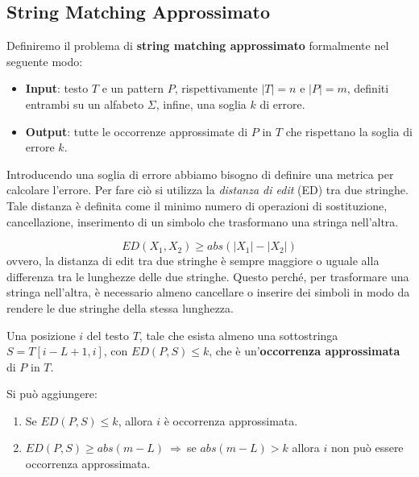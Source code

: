 \subsection{String Matching Approssimato}
Definiremo il problema di \textbf{string matching approssimato} formalmente nel
seguente modo:
\begin{itemize}
    \item \textbf{Input}: testo $T$ e un pattern $P$, rispettivamente $|T| = n$ e
          $|P| = m$, definiti entrambi su un alfabeto $\Sigma$, infine, una
          soglia $k$ di errore.
    \item \textbf{Output}: tutte le occorrenze approssimate di $P$ in $T$ che
          rispettano la soglia di errore $k$.
\end{itemize}
Introducendo una soglia di errore abbiamo bisogno di definire una metrica per
calcolare l'errore. Per fare ciò si utilizza la \textit{distanza di edit} (ED)
tra due stringhe. Tale distanza è definita come il minimo numero di operazioni di
sostituzione, cancellazione, inserimento di un simbolo che trasformano una
stringa nell'altra.
\begin{nota}
    \begin{equation}
        ED(X_1, X_2) \geq abs(|X_1| - |X_2|)
    \end{equation}
    ovvero, la distanza di edit tra due stringhe è sempre maggiore o uguale alla
    differenza tra le lunghezze delle due stringhe. Questo perché, per trasformare
    una stringa nell'altra, è necessario almeno cancellare o inserire dei simboli
    in modo da rendere le due stringhe della stessa lunghezza.
\end{nota}
\begin{definizione}
    Una posizione $i$ del testo $T$, tale che esista almeno una sottostringa
    $S = T[i - L + 1,i]$, con $ED(P, S) \leq k$, che è un'\textbf{occorrenza
        approssimata} di $P$ in $T$.
\end{definizione}
\begin{nota}
    Si può aggiungere:
    \begin{enumerate}
        \item Se $ED(P, S) \leq k$, allora $i$ è occorrenza approssimata.
        \item $ED(P, S) \geq abs(m - L) \ \Rightarrow \ $se $abs(m - L) > k$
              allora $i$ non può essere occorrenza approssimata.
    \end{enumerate}
\end{nota}
